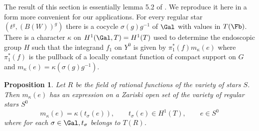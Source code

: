 \documentclass{memo-l}
\newtheorem{proposition}[theorem]{Proposition}
\theoremstyle{definition}
\theoremstyle{remark}
\numberwithin{section}{chapter}
\numberwithin{equation}{chapter}
\begin{document}
The result of this section is essentially lemma 5.2 of \cite{MR701566}.  We
reproduce it here in a form more convenient for our applications.  For
every regular star $(t^{g},(B(W))^{g})$ there is a cocycle
${\sigma}(g)g^{-1}$ of $\Gal$ with values in $T(\Fb)$.  There is a
character ${\kappa}$ on $H^{1}(\Gal,T) = H^{1}(T)$ used to determine
the endoscopic group $H$ such that the integrand $f_{1}$ on $Y^{0}$ is
given by ${\pi}_{1}^{*}(f)m_{{\kappa}}(e)$ where ${\pi}_{1}^{*}(f)$ is
the pullback of a locally constant function of compact support on $G$
and $m_{{\kappa}}(e) = {\kappa}({\sigma}(g)g^{-1})$.

\addtocounter{theorem}{1} %

\begin{proposition}   Let $R$ be the field of rational functions
of the variety of stars $S$.
 Then $m_{{\kappa}}(e)$ has an expression on a Zariski open set of the
variety of regular stars $S^{0}$
$$
m_{{\kappa}}(e) = {\kappa}(t_{{\sigma}}(e)), \qquad t_{{\sigma}}(e) \in H^{1}(T), \qquad
e \in S^{0}
$$
where for each ${\sigma} \in \Gal, t_{{\sigma}}$ belongs to
$T(R)$.
\end{proposition}
\end{document}
